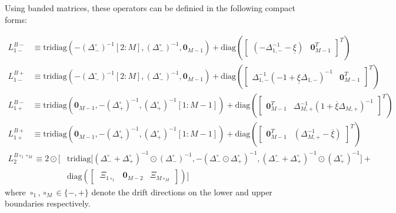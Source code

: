 \documentclass[11pt]{article}
\newcommand{\tridiag}{\ensuremath{\mathrm{tridiag}}}
\newcommand{\diag}{\ensuremath{\mathrm{diag}}}
\theoremstyle{definition}
\begin{document}
Using banded matrices, these operators can be definied in the following compact forms:


\begin{align}
{L}_{1-}^{B-} &\equiv
\tridiag \left(-(\Delta_-^\circ)^{-1}[2:M], (\Delta_-^\circ )^{-1}, \mathbf{0}_{M-1}  \right) +
\diag\left( 
\begin{bmatrix}
(-\Delta^{-1}_{1,-} - \underline{\xi} ) &
\mathbf{0}_{M-1}^T
\end{bmatrix}^T
\right) \\
{L}_{1-}^{B+} &\equiv
\tridiag \left(-(\Delta_-^\circ)^{-1}[2:M], (\Delta_-^\circ )^{-1}, \mathbf{0}_{M-1}  \right) +
\diag\left( 
\begin{bmatrix}
\Delta^{-1}_{1,-} (-1 + \underline{\xi} \Delta_{1,-})^{-1} &
\mathbf{0}_{M-1}^T
\end{bmatrix}^T
\right)
\end{align}
\begin{align}
{L}_{1+}^{B-} &\equiv
\tridiag \left(\mathbf{0}_{M-1}, -(\Delta_+^\circ )^{-1}, (\Delta_+^\circ)^{-1}[1:M-1]  \right) +
\diag\left( 
\begin{bmatrix}
\mathbf{0}_{M-1}^T &
\Delta^{-1}_{M,+} (1 + \overline{\xi} \Delta_{M,+})^{-1}
\end{bmatrix}^T
\right) \\
{L}_{1+}^{B+} &\equiv
\tridiag \left(\mathbf{0}_{M-1}, -(\Delta_+^\circ )^{-1}, (\Delta_+^\circ)^{-1}[1:M-1]  \right) +
\diag\left( 
\begin{bmatrix}
\mathbf{0}_{M-1}^T &
(\Delta^{-1}_{M,+} - \overline{\xi})
\end{bmatrix}^T
\right) 
\end{align}
\begin{align}
{L}_{2}^{B \circ_1 \circ_M } \equiv
2 \odot \Big[ & \text{tridiag} \Big[(\Delta_-^\circ + \Delta_+^\circ)^{-1} \odot (\Delta_{-}^\circ)^{-1}, 
-(\Delta_-^\circ \odot \Delta_+^\circ)^{-1},
(\Delta_-^\circ + \Delta_+^\circ)^{-1} \odot (\Delta_{+}^\circ)^{-1} \Big] + \\ & \diag\left(  
\begin{bmatrix} \
\Xi_{1 \circ_1} & \mathbf{0}_{M-2} & \Xi_{M \circ_M}
\end{bmatrix}
\right) \Big]
\end{align}
where $\circ_1, \circ_M \in \{-, +\}$ denote the drift directions on the lower and upper boundaries respectively.
\end{document}
